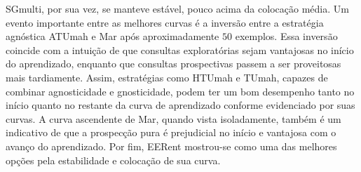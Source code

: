 SGmulti, por sua vez, se manteve estável, pouco acima da colocação média.
Um evento importante entre as melhores curvas é a inversão entre a estratégia agnóstica
ATUmah e Mar após aproximadamente $50$ exemplos.
Essa inversão coincide com a intuição de que consultas exploratórias sejam vantajosas no início do
aprendizado, enquanto que consultas prospectivas passem a ser proveitosas mais tardiamente.
Assim, estratégias como HTUmah e TUmah, capazes de combinar agnosticidade e gnosticidade,
podem ter um bom desempenho tanto no início quanto no restante da curva de aprendizado
conforme evidenciado por suas curvas.
A curva ascendente de Mar, quando vista isoladamente, também é um indicativo de que a prospecção pura
é prejudicial no início e vantajosa com o avanço do aprendizado.
Por fim, EERent mostrou-se como uma das melhores opções pela estabilidade e colocação de sua curva.

